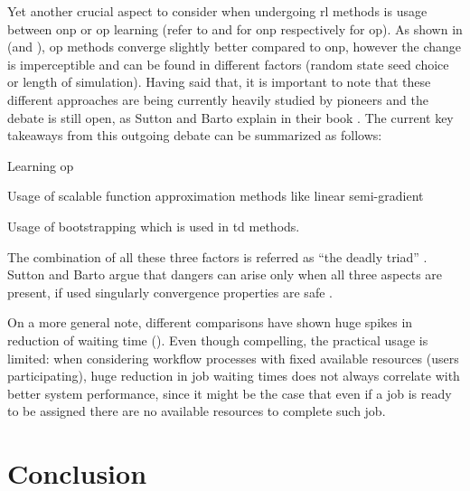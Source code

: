 \documentclass{seal_thesis}
\begin{document}
Yet another crucial aspect to consider when undergoing \gls{rl} methods is usage between \gls{onp} or \gls{op} learning (refer to  and  for \gls{onp} respectively  for \gls{op}). As shown in  (and ), \gls{op} methods converge slightly better compared to \gls{onp}, however the change is imperceptible and can be found in different factors (\eg random state seed choice or length of simulation). Having said that, it is important to note that these different approaches are being currently heavily studied by pioneers and the debate is still open, as Sutton and Barto explain in their book \cite[pp. 245-249]{Sutton2017}. The current key takeaways from this outgoing debate can be summarized as follows:
\begin{enumerate*}
	\item Learning \gls{op}
	\item Usage of scalable function approximation methods like linear semi-gradient 
	\item Usage of bootstrapping which is used in \gls{td} methods.
\end{enumerate*}


The combination of all these three factors is referred as ``the deadly triad'' \cite[p. 249]{Sutton2017}. Sutton and Barto argue that dangers can arise only when all three aspects are present, if used singularly convergence properties are safe \cite[p. 249]{Sutton2017}.

On a more general note, different comparisons have shown huge spikes in reduction of waiting time (\eg {}). Even though compelling, the practical usage is limited: when considering workflow processes with fixed available resources (\ie users participating), huge reduction in job waiting times does not always correlate with better system performance, since it might be the case that even if a job is ready to be assigned there are no available resources to complete such job.



\chapter{Conclusion}
\label{ch:conclusion}
\end{document}
